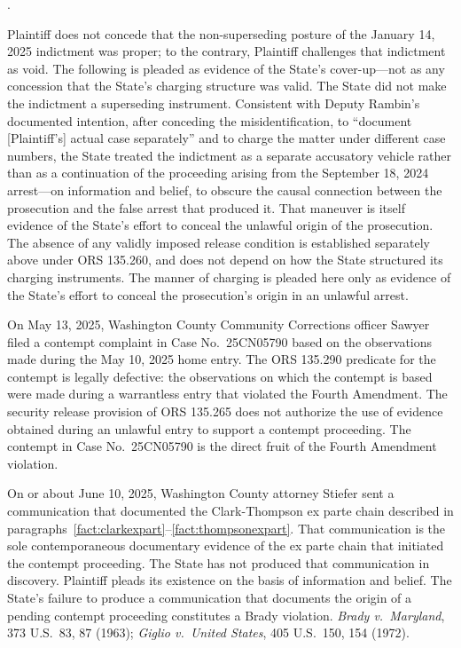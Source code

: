 \documentclass[12pt,letterpaper]{article}
\newcounter{complaintpara}
\newenvironment{paras}{%
	\begin{list}{\arabic{complaintpara}.}{%
			\setlength{\leftmargin}{0.5in}%
			\setlength{\labelwidth}{0.4in}%
			\setlength{\labelsep}{0.1in}%
			\setlength{\itemsep}{0pt}%
			\setlength{\parsep}{0pt}%
			\setlength{\topsep}{6pt}%
		}%
	}{%
	\end{list}%
}
\begin{document}
\begin{paras}
		\item\label{fact:nosupersede} Plaintiff does not concede that the non-superseding posture of the January 14, 2025 indictment was proper; to the contrary, Plaintiff challenges that indictment as void. The following is pleaded as evidence of the State's cover-up---not as any concession that the State's charging structure was valid. The State did not make the indictment a superseding instrument. Consistent with Deputy Rambin's documented intention, after conceding the misidentification, to ``document [Plaintiff's] actual case separately'' and to charge the matter under different case numbers, the State treated the indictment as a separate accusatory vehicle rather than as a continuation of the proceeding arising from the September 18, 2024 arrest---on information and belief, to obscure the causal connection between the prosecution and the false arrest that produced it. That maneuver is itself evidence of the State's effort to conceal the unlawful origin of the prosecution. The absence of any validly imposed release condition is established separately above under ORS 135.260, and does not depend on how the State structured its charging instruments. The manner of charging is pleaded here only as evidence of the State's effort to conceal the prosecution's origin in an unlawful arrest.

		\item\label{fact:sawyer} On May 13, 2025, Washington County
		Community Corrections officer Sawyer filed a contempt
		complaint in Case No.\ 25CN05790 based on the observations
		made during the May 10, 2025 home entry. The ORS 135.290
		predicate for the contempt is legally defective: the
		observations on which the contempt is based were made during
		a warrantless entry that violated the Fourth Amendment. The
		security release provision of ORS 135.265 does not authorize
		the use of evidence obtained during an unlawful entry to
		support a contempt proceeding. The contempt in Case
		No.\ 25CN05790 is the direct fruit of the Fourth Amendment
		violation.
		
		\item\label{fact:stiefer} On or about June 10, 2025, Washington
		County attorney Stiefer sent a communication that documented
		the Clark-Thompson ex parte chain described in
		paragraphs~\ref{fact:clarkexpart}--\ref{fact:thompsonexpart}.
		That communication is the sole contemporaneous documentary
		evidence of the ex parte chain that initiated the contempt
		proceeding. The State has not produced that communication in
		discovery. Plaintiff pleads its existence on the basis of
		information and belief. The State's failure to produce a
		communication that documents the origin of a pending contempt
		proceeding constitutes a Brady violation.
		\textit{Brady v.\ Maryland}, 373 U.S.\ 83, 87 (1963);
		\textit{Giglio v.\ United States}, 405 U.S.\ 150, 154 (1972).
		

\end{paras}
\end{document}
